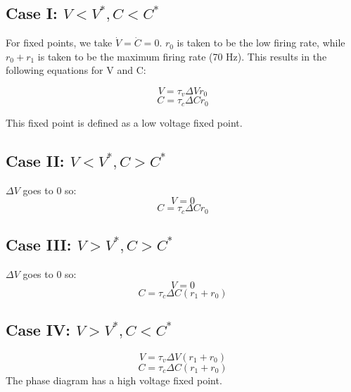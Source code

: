 \documentclass[11pt,letterpaper]{article}
\begin{document}
\subsection*{Case I: $V < V^*, C < C^*$}
For fixed points, we take $\dot{V} = \dot{C} = 0$. $r_0$ is taken to be the low firing rate, while $r_0 + r_1$ is taken to be the maximum firing rate (70 Hz). This results in the following equations for V and C: 

\begin{equation}
V = \tau _v \Delta V r_0 
\end{equation}
\begin{equation}
C = \tau _c \Delta C r_0 
\end{equation}

This fixed point is defined as a low voltage fixed point. 

\subsection*{Case II: $V < V^*, C > C^*$}
$\Delta V$ goes to 0 so: 
\begin{equation}
V = 0
\end{equation}
\begin{equation}
C = \tau _c \Delta C r_0
\end{equation}
\subsection*{Case III: $V > V^*, C > C^*$}
$\Delta V$ goes to 0 so: 
\begin{equation}
V = 0
\end{equation}
\begin{equation}
C = \tau _c \Delta C(r_1 + r_0)
\end{equation}

\subsection*{Case IV: $V > V^*, C < C^*$}
\begin{equation}
V = \tau_v \Delta V (r_1 + r_0) 
\end{equation}
\begin{equation}
C = \tau_c \Delta C (r_1 + r_0) 
\end{equation}
The phase diagram has a high voltage fixed point. 
\end{document}
